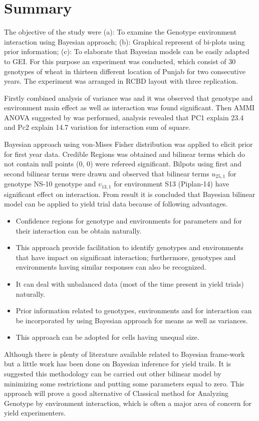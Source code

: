\chapter{Summary}\label{summary_chapter}
The objective of the study were (a): To examine the Genotype environment interaction using Bayesian approach; (b): Graphical represent of bi-plots using prior information; (c): To elaborate that Bayesian models can be easily adapted to GEI. For this purpose an experiment was conducted, which consist of 30 genotypes of wheat in thirteen different location of Punjab for two consecutive years. The experiment was arranged in RCBD layout with three replication.

Firstly combined analysis of variance was and it was observed that genotype and environment  main effect as well as interaction was found significant. Then AMMI ANOVA suggested by \cite{GOLLOB1968} was performed, analysis revealed that PC1 explain 23.4 and Pc2 explain 14.7 variation for interaction sum of square.

Bayesian approach using von-Mises Fisher distribution was applied to elicit prior for first year data. Credible Regions was obtained and bilinear terms which do not contain null points (0, 0) were refereed significant. Bilpots using first and second bilinear terms were drawn and observed that bilinear terms  $u_{25,1}$ for genotype NS-10 genotype and $v_{13,1}$ for environment S13 (Piplan-14) have significant effect on interaction. From result it is concluded that Bayesian bilinear model can be applied to yield trial data because of following advantages.
 \begin{itemize}
 	
 	\item  Confidence regions for genotype and environments for parameters and for their interaction can be obtain naturally.
 	\item  This approach provide facilitation to identify genotypes and environments that have impact on significant interaction; furthermore, genotypes and environments having similar responses can also be recognized. 
 	\item It can deal with unbalanced data (most of the time present in yield trials)  naturally.
 	\item  Prior information related to genotypes, environments and for interaction can be incorporated by using Bayesian approach for means as well as variances.
 	\item This approach  can be adopted for cells having unequal size.
 
 \end{itemize}
 
 Although there is plenty of literature available related to Bayesian frame-work but a little work has been done on Bayesian inference for yield trails. It is suggested this methodology can be carried out other bilinear model by minimizing some restrictions and putting some parameters equal to zero. This approach will prove a good alternative of Classical method for Analyzing Genotype by environment interaction, which is often a major area of concern for yield experimenters.